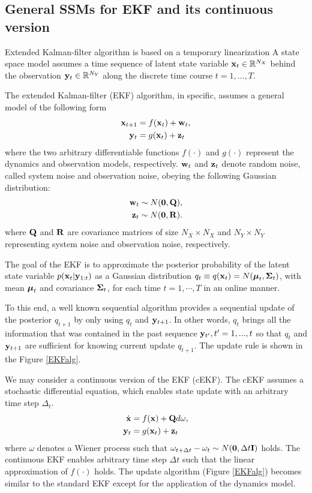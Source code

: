 \documentclass{article}
\begin{document}
\subsection{General SSMs for EKF and its continuous version}
Extended Kalman-filter algorithm is based on a temporary linearization
A state space model assumes a time sequence of latent state variable ${\bf x}_t\in\mathbb{R}^{N_X}$
behind the observation ${\bf y}_t\in\mathbb{R}^{N_Y}$ along the discrete time course $t=1,...,T$.


The extended Kalman-filter (EKF) algorithm, in specific, assumes a general model of the following form
\begin{align}
 {\bf x}_{t+1} &= f( {\bf x}_t ) + {\bf w}_t, \\
 {\bf y}_{t} &= g( {\bf x}_t ) + {\bf z}_t
\end{align}
where the two arbitrary differentiable functions
$f(\cdot)$ and $g(\cdot)$ represent the dynamics and observation models, respectively.
${\bf w}_t$ and ${\bf z}_t$ denote random noise, called system noise and observation noise, obeying the following Gaussian distribution:
\begin{align}
 {\bf w}_{t} \sim N( {\bf 0}, {\bf Q} ), \\
 {\bf z}_{t} \sim N( {\bf 0}, {\bf R} ).
\end{align}
where ${\bf Q}$ and ${\bf R}$ are covariance matrices of size $N_X\times N_X$ and $N_Y\times N_Y$
representing system noise and observation noise, respectively. 

The goal of the EKF is to approximate the posterior probability of the latent state variable
 $p({\bf x}_t | {\bf y}_{1:t} )$ as a Gaussian distribution $q_t \equiv q({\bf x}_t) = N({\boldsymbol{\mu}}_t, {\boldsymbol{\Sigma}}_t)$,
 with mean ${\boldsymbol{\mu}}_t$ and covariance ${\boldsymbol{\Sigma}}_t$,
 for each time $t=1,\cdots,T$ in an online manner.
 
To this end, a well known sequential algorithm provides a sequential update of the posterior $q_{t+1}$ by only using $q_{t}$ and ${\bf y}_{t+1}$.
In other words, $q_{t}$ brings all the information that was contained in the
past sequence ${\bf y}_{t'}, t'=1,...,t$ so that $q_{t}$ and ${\bf y}_{t+1}$ are sufficient for knowing current update $q_{t+1}$.
The update rule is shown in the Figure \ref{EKFalg}.

We may consider a continuous version of the EKF (cEKF). 
The cEKF assumes a stochastic differential equation, which enables state update with an arbitrary time step $\Delta_t$.
\begin{align}
 \dot{{\bf x}}  &= f( {\bf x} ) + {\bf Q} d\omega, \label{cont_dyn}\\
 {\bf y}_{t} &= g( {\bf x}_t ) + {\bf z}_t
\end{align}
where $\omega$ denotes a Wiener process such that
$\omega_{t+\Delta t}-\omega_t \sim N({\bf 0},\Delta t{\bf I})$ holds.
The continuous EKF enables arbitrary time step $\Delta t$ such that
 the linear approximation of $f(\cdot)$ holds.
The update algorithm (Figure \ref{EKFalg})
becomes similar to the standard EKF except for the application of the dynamics model.
 
\end{document}
